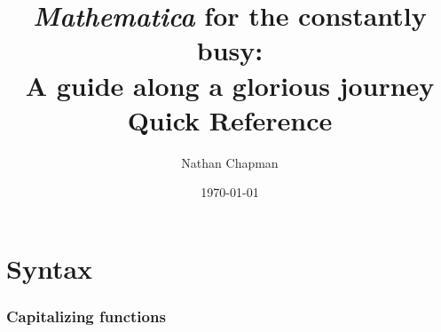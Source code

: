 \documentclass[11pt,a4paper,twoside]{article}
\author{Nathan Chapman}
\title{ \textit{Mathematica} for the constantly busy: \\ A guide along a glorious journey \\ Quick Reference}
\date{\today}
\begin{document}
	\begin{titlepage}

		\maketitle
		
	\end{titlepage}
	
	\tableofcontents
	
	\newpage
	
%	
%		

	\part{Syntax}

		\section{Capitalizing functions}
			
\end{document}
